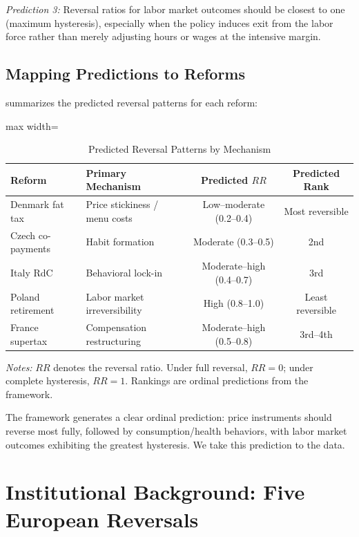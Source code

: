 \documentclass[12pt]{article}
\begin{document}
\textit{Prediction 3:} Reversal ratios for labor market outcomes should be closest to one (maximum hysteresis), especially when the policy induces exit from the labor force rather than merely adjusting hours or wages at the intensive margin.

\subsection{Mapping Predictions to Reforms}

 summarizes the predicted reversal patterns for each reform:

\begin{table}[H]
\centering
\caption{Predicted Reversal Patterns by Mechanism}
\label{tab:predictions}
\begin{adjustbox}{max width=\textwidth}
\begin{tabular}{llcc}
\toprule
Reform & Primary Mechanism & Predicted $RR$ & Predicted Rank \\
\midrule
Denmark fat tax & Price stickiness / menu costs & Low--moderate (0.2--0.4) & Most reversible \\
Czech co-payments & Habit formation & Moderate (0.3--0.5) & 2nd \\
Italy RdC & Behavioral lock-in & Moderate--high (0.4--0.7) & 3rd \\
Poland retirement & Labor market irreversibility & High (0.8--1.0) & Least reversible \\
France supertax & Compensation restructuring & Moderate--high (0.5--0.8) & 3rd--4th \\
\bottomrule
\end{tabular}
\end{adjustbox}
\par\vspace{0.3em}
{\small \textit{Notes:} $RR$ denotes the reversal ratio. Under full reversal, $RR = 0$; under complete hysteresis, $RR = 1$. Rankings are ordinal predictions from the framework.}
\end{table}

The framework generates a clear ordinal prediction: price instruments should reverse most fully, followed by consumption/health behaviors, with labor market outcomes exhibiting the greatest hysteresis. We take this prediction to the data.


\section{Institutional Background: Five European Reversals}
\label{sec:background}
\end{document}
